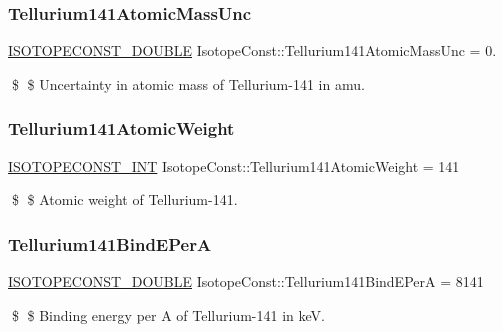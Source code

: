 \subsubsection{\texorpdfstring{Tellurium141\+Atomic\+Mass\+Unc}{Tellurium141AtomicMassUnc}}
{\footnotesize\ttfamily \mbox{\hyperlink{group___isotope_const-_macros_ga8f45a7272ce02c0b4c65c44636ed719a}{I\+S\+O\+T\+O\+P\+E\+C\+O\+N\+S\+T\+\_\+\+D\+O\+U\+B\+LE}} Isotope\+Const\+::\+Tellurium141\+Atomic\+Mass\+Unc = 0.}

\$ \$ Uncertainty in atomic mass of Tellurium-\/141 in amu. \mbox{\label{group___isotope_const-_tellurium-_te141_ga7cb351fca498b44522911fde674fb6b2}} 
\subsubsection{\texorpdfstring{Tellurium141\+Atomic\+Weight}{Tellurium141AtomicWeight}}
{\footnotesize\ttfamily \mbox{\hyperlink{group___isotope_const-_macros_ga5f18360b3e99483a35c32d789e62621c}{I\+S\+O\+T\+O\+P\+E\+C\+O\+N\+S\+T\+\_\+\+I\+NT}} Isotope\+Const\+::\+Tellurium141\+Atomic\+Weight = 141}

\$ \$ Atomic weight of Tellurium-\/141. \mbox{\label{group___isotope_const-_tellurium-_te141_gafdfc3df0796c34f0557564f3c327f123}} 
\subsubsection{\texorpdfstring{Tellurium141\+Bind\+E\+PerA}{Tellurium141BindEPerA}}
{\footnotesize\ttfamily \mbox{\hyperlink{group___isotope_const-_macros_ga8f45a7272ce02c0b4c65c44636ed719a}{I\+S\+O\+T\+O\+P\+E\+C\+O\+N\+S\+T\+\_\+\+D\+O\+U\+B\+LE}} Isotope\+Const\+::\+Tellurium141\+Bind\+E\+PerA = 8141}

\$ \$ Binding energy per A of Tellurium-\/141 in keV. \mbox{\label{group___isotope_const-_tellurium-_te141_ga05a4db6271003c7a6d88a2ee9dbd8292}} 
